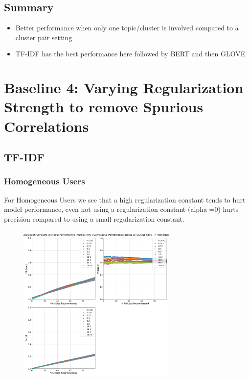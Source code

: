 \documentclass[a4paper,fontsize=8.0pt]{scrartcl}
\begin{document}
\subsection{Summary}
\begin{itemize}
    \item Better performance when only one topic/cluster is involved compared to a cluster pair setting
    \item TF-IDF has the best performance here followed by BERT and then GLOVE
\end{itemize}


\newpage
\section{Baseline 4: Varying Regularization Strength to remove Spurious Correlations}
\begin{flushleft}
\subsection{TF-IDF}
\subsubsection{Homogeneous Users}
\begin{flushleft}
For Homogeneous Users we see that a high regularization constant tends to hurt model performance, even not using a regularization constant (alpha =0) hurts precision compared to using a small regularization constant.
\end{flushleft}
\end{flushleft}
\vspace{-6ex}
\begin{figure}[H]
 \includegraphics[width=0.7\textwidth]{Graphs/TFIDF/regularization_vs_model_performance_cumu_Homogeneous.pdf}
\end{figure}
\end{document}
